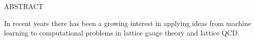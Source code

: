 \begin{doublespace}
\begin{tightcenter}
ABSTRACT
\mylinespacing%
\end{tightcenter}


%
In recent years there has been a growing interest in applying ideas from machine learning to computational problems in
lattice gauge theory and lattice QCD.\@
%


%
%

%


\end{doublespace}
